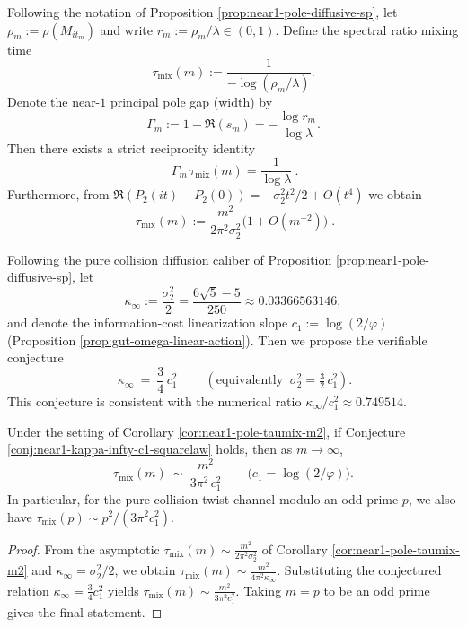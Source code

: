 \begin{corollary}\label{cor:near1-pole-taumix-m2}
Following the notation of Proposition \ref{prop:near1-pole-diffusive-sp}, let \(\rho_m:=\rho(M_{it_m})\) and write \(r_m:=\rho_m/\lambda\in(0,1)\).
Define the spectral ratio mixing time
\[
\tau_{\mathrm{mix}}(m):=\frac{1}{-\log(\rho_m/\lambda)}.
\]
Denote the near-\(1\) principal pole gap (width) by
\[
\Gamma_m:=1-\Re(s_m)=-\frac{\log r_m}{\log\lambda}.
\]
Then there exists a strict reciprocity identity
\[
\boxed{\ \Gamma_m\,\tau_{\mathrm{mix}}(m)=\frac{1}{\log\lambda}\ }.
\]
Furthermore, from \(\Re(P_2(it)-P_2(0))=-\sigma_2^2 t^2/2+O(t^4)\) we obtain
\[
\boxed{\;
\tau_{\mathrm{mix}}(m)
:=\frac{m^2}{2\pi^2\sigma_2^2}\bigl(1+O(m^{-2})\bigr)\; }.
\]
\end{corollary}

\begin{conjecture}[Square coupling of long-range constants: information-cost slope \texorpdfstring{$c_1=\log(2/\varphi)$}{c1=log(2/phi)} and diffusion constant \texorpdfstring{$\kappa_\infty$}{kappa_infty}]\label{conj:near1-kappa-infty-c1-squarelaw}
Following the pure collision diffusion caliber of Proposition \ref{prop:near1-pole-diffusive-sp}, let
\[
\kappa_\infty:=\frac{\sigma_2^2}{2}=\frac{6\sqrt5-5}{250}\approx 0.03366563146,
\]
and denote the information-cost linearization slope \(c_1:=\log(2/\varphi)\) (Proposition \ref{prop:gut-omega-linear-action}).
Then we propose the verifiable conjecture
\[
\boxed{\ \kappa_\infty\ =\ \frac{3}{4}\,c_1^{2}\ }
\qquad
(\text{equivalently } \ \sigma_2^2=\tfrac{3}{2}\,c_1^2).
\]
This conjecture is consistent with the numerical ratio \(\kappa_\infty/c_1^2\approx 0.749514\).
\end{conjecture}

\begin{corollary}\label{cor:near1-taumix-leading-coeff-from-c1}
Under the setting of Corollary \ref{cor:near1-pole-taumix-m2}, if Conjecture \ref{conj:near1-kappa-infty-c1-squarelaw} holds, then as \(m\to\infty\),
\[
\tau_{\mathrm{mix}}(m)\ \sim\ \frac{m^2}{3\pi^2\,c_1^2}
\qquad\bigl(c_1=\log(2/\varphi)\bigr).
\]
In particular, for the pure collision twist channel modulo an odd prime \(p\), we also have
\(
\tau_{\mathrm{mix}}(p)\sim {p^2}/{(3\pi^2c_1^2)}.
\)
\end{corollary}
\begin{proof}
From the asymptotic \(
\tau_{\mathrm{mix}}(m)\sim \frac{m^2}{2\pi^2\sigma_2^2}
\)
of Corollary \ref{cor:near1-pole-taumix-m2} and \(\kappa_\infty=\sigma_2^2/2\), we obtain
\(
\tau_{\mathrm{mix}}(m)\sim \frac{m^2}{4\pi^2\kappa_\infty}
\).
Substituting the conjectured relation \(\kappa_\infty=\frac34 c_1^2\) yields
\(
\tau_{\mathrm{mix}}(m)\sim \frac{m^2}{3\pi^2c_1^2}
\).
Taking \(m=p\) to be an odd prime gives the final statement.
\end{proof}

